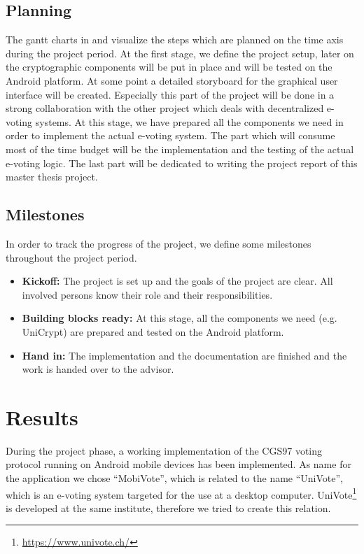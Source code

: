 \documentclass[numbers=noenddot, abstract=on, a4paper, headsepline,
footsepline, oneside, draft=off]{scrreprt}
\begin{document}
\section{Planning}
\label{sec:planning}
The gantt charts in  and 
visualize the steps which are planned on the time axis during the project period. At the first stage, we define the project setup,
later on the cryptographic components will be put in place and will be tested on
the Android platform. At some point a detailed storyboard for the graphical
user interface will be created. Especially this part of the project will be done
in a strong collaboration with the other project which deals with decentralized e-voting
systems. At this stage, we have prepared all the components we need in order to
implement the actual e-voting system. The part which will consume most of the
time budget will be the implementation and the testing of the actual e-voting
logic. The last part will be dedicated to writing the project report of this
master thesis project.



\section{Milestones}
\label{sec:milestones}
In order to track the progress of the project, we define some milestones
throughout the project period.
\begin{itemize}
  \item \textbf{Kickoff:} The project is set up and the goals of the project
  are clear. All involved persons know their role and their responsibilities.
  \item \textbf{Building blocks ready:} At this stage, all the components we
  need (e.g. UniCrypt) are prepared and tested on the Android platform.
  \item \textbf{Hand in:} The implementation and the documentation are finished
  and the work is handed over to the advisor.
\end{itemize}

\chapter{Results}
\label{cha:results}
During the project phase, a working implementation of the CGS97 voting protocol
running on Android mobile devices has been implemented. As name for the
application we chose ``MobiVote'', which is related to the name ``UniVote'',
which is an e-voting system targeted for the use at a desktop computer.
UniVote\footnote{\url{https://www.univote.ch/}} is developed at the same
institute, therefore we tried to create this relation.
\end{document}
